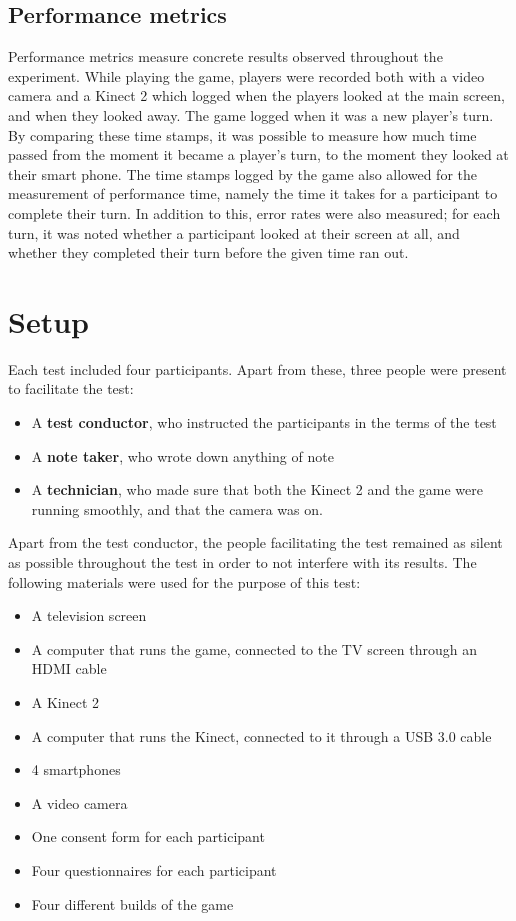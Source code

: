 \subsection{Performance metrics}\label{subsec:performance_metrics}
Performance metrics measure concrete results observed throughout the experiment. While playing the game, players were recorded both with a video camera and a Kinect 2 which logged when the players looked at the main screen, and when they looked away. The game logged when it was a new player's turn. By comparing these time stamps, it was possible to measure how much time passed from the moment it became a player's turn, to the moment they looked at their smart phone. The time stamps logged by the game also allowed for the measurement of performance time, namely the time it takes for a participant to complete their turn. In addition to this, error rates were also measured; for each turn, it was noted whether a participant looked at their screen at all, and whether they completed their turn before the given time ran out. 

\section{Setup}
Each test included four participants. Apart from these, three people were present to facilitate the test:

\begin{itemize}
	\item A \textbf{test conductor}, who instructed the participants in the terms of the test
	\item A \textbf{note taker}, who wrote down anything of note
	\item A \textbf{technician}, who made sure that both the Kinect 2 and the game were running smoothly, and that the camera was on.
\end{itemize}

Apart from the test conductor, the people facilitating the test remained as silent as possible throughout the test in order to not interfere with its results. The following materials were used for the purpose of this test:

\begin{itemize}
	\item A television screen
	\item A computer that runs the game, connected to the TV screen through an HDMI cable
	\item A Kinect 2
	\item A computer that runs the Kinect, connected to it through a USB 3.0 cable
	\item 4 smartphones
	\item A video camera
	\item One consent form for each participant
	\item Four questionnaires for each participant
	\item Four different builds of the game
\end{itemize}

